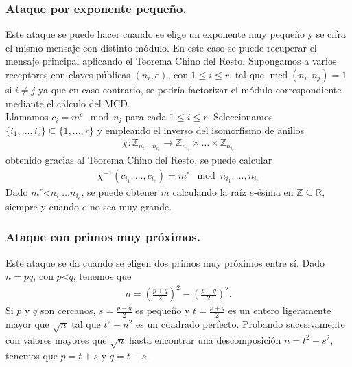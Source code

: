 	\subsubsection{Ataque por exponente pequeño.}
	Este ataque se puede hacer cuando se elige un exponente muy pequeño y se cifra el mismo mensaje con distinto módulo. En este caso se puede recuperar el mensaje principal aplicando el Teorema Chino del Resto. Supongamos a varios receptores con claves públicas $(n_i, e)$, con $1\leq i \leq r$, tal que $\operatorname{mcd}(n_i, n_j) = 1$ si $i\neq j$ ya que en caso contrario, se podría factorizar el módulo correspondiente mediante el cálculo del MCD.\\
	Llamamos $c_i = m^e \mod n_i$ para cada $1\leq i \leq r$. Seleccionamos $\{i_1,...,i_e \}\subseteq \{1,...,r\}$ y empleando el inverso del isomorfismo de anillos
	\begin{align*}
		\chi:\mathbb{Z}_{n_{i_1}\dots n_{i_e}}\rightarrow \mathbb{Z}_{n_{i_1}}\times \dots \times \mathbb{Z}_{n_{i_e}}
	\end{align*}
	obtenido gracias al Teorema Chino del Resto, se puede calcular
	\begin{align*}
		\chi^{-1}(c_{i_1},\dots,c_{i_e}) = m^e \mod n_{i_1},\dots,n_{i_e}
	\end{align*}
	Dado $m^e$\textless $n_{i_1}\dots n_{i_e}$, se puede obtener $m$ calculando la raíz $e$-ésima en $\mathbb{Z} \subseteq \mathbb{R}$, siempre y cuando $e$ no sea muy grande.

	\subsubsection{Ataque con primos muy próximos.}
	Este ataque se da cuando se eligen dos primos muy próximos entre sí. Dado $n=pq$, con $p$\textless $q$, tenemos que  
	\begin{align*}
			n=\left (\frac{p+q}{2}\right )^2-\left (\frac{p-q}{2}\right )^2.
	\end{align*}
	Si $p$ y $q$ son cercanos, $s=\frac{p-q}{2}$ es pequeño y $t=\frac{p+q}{2}$ es un entero ligeramente mayor que $\sqrt{n}$ tal que $t^2 - n^2$ es un cuadrado perfecto. Probando sucesivamente con valores mayores que $\sqrt{n}$ hasta encontrar una descomposición $n=t^2-s^2$, tenemos que $p=t+s$ y $q=t-s$.


